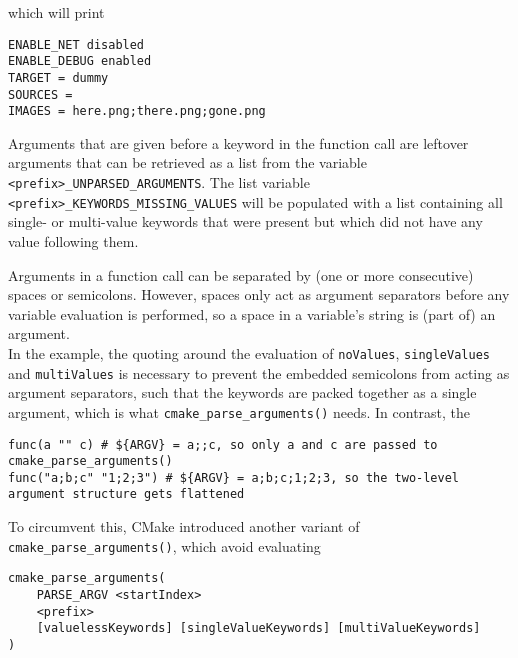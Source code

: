 \documentclass[8pt, table, xcdraw]{article}%
\begin{document}
which will print

\begin{lstlisting}
ENABLE_NET disabled
ENABLE_DEBUG enabled
TARGET = dummy
SOURCES =
IMAGES = here.png;there.png;gone.png
\end{lstlisting}

Arguments that are given before a keyword in the function call are leftover arguments that can be retrieved as a list from the variable \lstinline{<prefix>_UNPARSED_ARGUMENTS}. The list variable \lstinline{<prefix>_KEYWORDS_MISSING_VALUES} will be populated with a list containing all single- or multi-value keywords that were present but which did not have any value following them.

Arguments in a function call can be separated by (one or more consecutive) spaces or semicolons. However, spaces only act as argument separators before any variable evaluation is performed, so a space in a variable's string is (part of) an argument.\\
In the example, the quoting around the evaluation of \lstinline{noValues}, \lstinline{singleValues} and \lstinline{multiValues} is necessary to prevent the embedded semicolons from acting as argument separators, such that the keywords are packed together as a single argument, which is what \lstinline{cmake_parse_arguments()} needs. In contrast, the %

\begin{lstlisting}
func(a "" c) # ${ARGV} = a;;c, so only a and c are passed to cmake_parse_arguments()
func("a;b;c" "1;2;3") # ${ARGV} = a;b;c;1;2;3, so the two-level argument structure gets flattened
\end{lstlisting}

To circumvent this, CMake introduced another variant of \lstinline{cmake_parse_arguments()}, which avoid evaluating

\begin{lstlisting}
cmake_parse_arguments(
    PARSE_ARGV <startIndex>
    <prefix>
    [valuelessKeywords] [singleValueKeywords] [multiValueKeywords]
)
\end{lstlisting}
\end{document}
